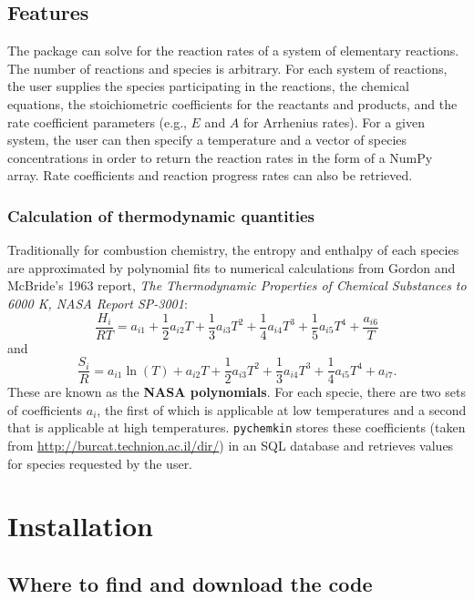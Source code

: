 \documentclass[12pt]{article}
\begin{document}
\subsection{Features}
The package can solve for the reaction rates of a system of elementary reactions. The number of reactions and species is arbitrary. For each system of reactions, the user supplies the species participating in the reactions, the chemical equations, the stoichiometric coefficients for the reactants and products, and the rate coefficient parameters (e.g., $E$ and $A$ for Arrhenius rates). For a given system, the user can then specify a temperature and a vector of species concentrations in order to return the reaction rates in the form of a NumPy array. Rate coefficients and reaction progress rates can also be retrieved. 

\subsubsection{Calculation of thermodynamic quantities}
Traditionally for combustion chemistry, the entropy and enthalpy of each species are approximated by polynomial fits to numerical calculations from Gordon and McBride's 1963 report, \textit{The Thermodynamic Properties of Chemical Substances to 6000 K, NASA Report SP-3001}:
\begin{equation}
\frac{H_{i}}{RT} = a_{i1} + \frac{1}{2}a_{i2}T + \frac{1}{3}a_{i3}T^{2} + \frac{1}{4}a_{i4}T^{3} + \frac{1}{5}a_{i5}T^{4} + \frac{a_{i6}}{T}
\end{equation}
and 
\begin{equation}
\frac{S_{i}}{R} = a_{i1}\ln\left(T\right) + a_{i2}T + \frac{1}{2}a_{i3}T^{2} + \frac{1}{3}a_{i4}T^{3} + \frac{1}{4}a_{i5}T^{4} + a_{i7}.
\end{equation}
These are known as the \textbf{NASA polynomials}. For each specie, there are two sets of coefficients $a_i$, the first of which is applicable at low temperatures and a second that is applicable at high temperatures. \texttt{pychemkin} stores these coefficients (taken from \url{http://burcat.technion.ac.il/dir/}) in an SQL database and retrieves values for species requested by the user. 




\section{Installation}

\subsection{Where to find and download the code}
\end{document}
